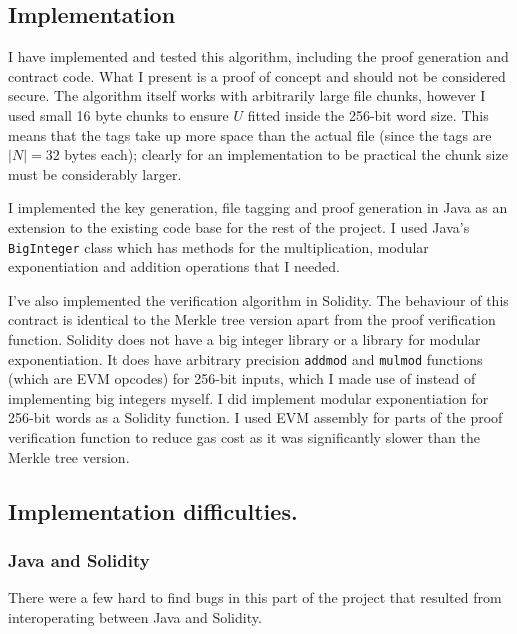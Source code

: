 \documentclass[12pt,a4paper,twoside,openright]{report}
\begin{document}
\subsection{Implementation}

I have implemented and tested this algorithm, including the proof generation and contract code.
What I present is a proof of concept and should not be considered secure. %
The algorithm itself works with arbitrarily large file chunks, however I used small 16 byte chunks to ensure $U$ fitted inside the 256-bit word size.
This means that the tags take up more space than the actual file (since the tags are $|N| = 32$ bytes each); clearly for an implementation to be practical
the chunk size must be considerably larger.

I implemented the key generation, file tagging and proof generation in Java as an extension to the existing code base for the rest of the project.
I used Java's \texttt{BigInteger} class which has methods for the multiplication, modular exponentiation and addition operations that I needed.

I've also implemented the verification algorithm in Solidity.
The behaviour of this contract is identical to the Merkle tree version apart from the proof verification function.
Solidity does not have a big integer library or a library for modular exponentiation.
It does have arbitrary precision \texttt{addmod} and \texttt{mulmod} functions (which are EVM opcodes) for 256-bit inputs,
which I made use of instead of implementing big integers myself.
I did implement modular exponentiation for 256-bit words as a Solidity function.
I used EVM assembly for parts of the proof verification function to reduce gas cost
as it was significantly slower than the Merkle tree version.




\subsection{Implementation difficulties.}

\subsubsection{Java and Solidity}

There were a few hard to find bugs in this part of the project that resulted from interoperating between Java and Solidity.
\end{document}
